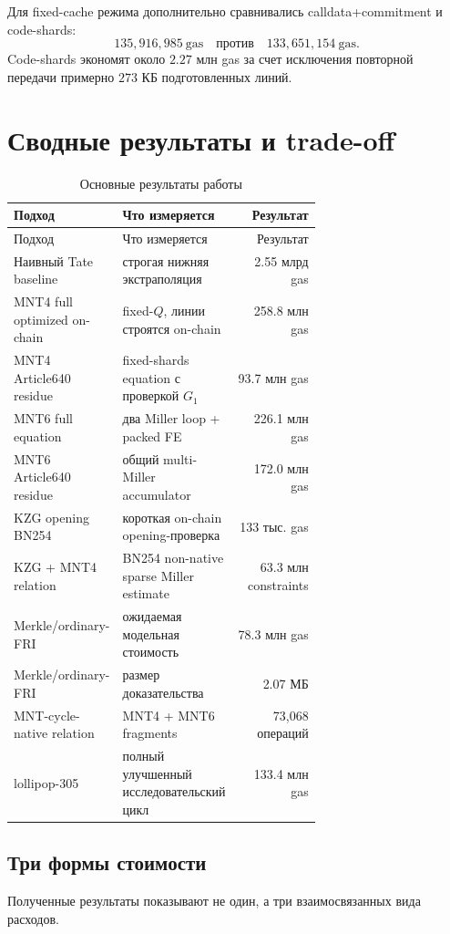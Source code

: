 \documentclass[12pt,a4paper]{article}
\newcommand{\Gas}{\mathrm{gas}}
\begin{document}
Для fixed-cache режима дополнительно сравнивались calldata+commitment и
code-shards:
\[
    135{,}916{,}985\ \Gas
    \quad\text{против}\quad
    133{,}651{,}154\ \Gas.
\]
Code-shards экономят около $2.27$ млн gas за счет исключения повторной передачи
примерно $273$ КБ подготовленных линий.

\section{Сводные результаты и trade-off}

\begin{longtable}{p{0.31\linewidth}p{0.36\linewidth}r}
\caption{Основные результаты работы}\\
\toprule
Подход & Что измеряется & Результат \\
\midrule
\endfirsthead
\toprule
Подход & Что измеряется & Результат \\
\midrule
\endhead
Наивный Tate baseline & строгая нижняя экстраполяция & 2.55 млрд gas \\
MNT4 full optimized on-chain & fixed-$Q$, линии строятся on-chain & 258.8 млн gas \\
MNT4 Article640 residue & fixed-shards equation с проверкой $G_1$ & 93.7 млн gas \\
MNT6 full equation & два Miller loop + packed FE & 226.1 млн gas \\
MNT6 Article640 residue & общий multi-Miller accumulator & 172.0 млн gas \\
KZG opening BN254 & короткая on-chain opening-проверка & 133 тыс. gas \\
KZG + MNT4 relation & BN254 non-native sparse Miller estimate & 63.3 млн constraints \\
Merkle/ordinary-FRI & ожидаемая модельная стоимость & 78.3 млн gas \\
Merkle/ordinary-FRI & размер доказательства & 2.07 МБ \\
MNT-cycle-native relation & MNT4 + MNT6 fragments & 73,068 операций \\
lollipop-305 & полный улучшенный исследовательский цикл & 133.4 млн gas \\
\bottomrule
\end{longtable}

\subsection{Три формы стоимости}

Полученные результаты показывают не один, а три взаимосвязанных вида расходов.
\end{document}
